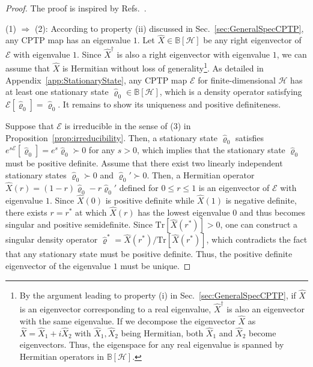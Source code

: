 \documentclass[preprint,pteplogo]{ptephy_v2}%
\numberwithin{equation}{section}
\theoremstyle{definition}
\newcommand{\mc}[1]{\mathcal{#1}}
\newcommand{\mr}[1]{\mathrm{#1}}
\newcommand{\mbb}[1]{\mathbb{#1}}
\newcommand{\Tr}{\mr{Tr}}
\begin{document}
\begin{proof}
The proof is inspired by Refs.~\cite{yoshida2024uniqueness, wolf2012quantum}.

(1) $\Rightarrow$ (2): 
According to property (ii) discussed in Sec.~\ref{sec:GeneralSpecCPTP}, any CPTP map has an eigenvalue $1$. 
Let $\hat{X} \in \mbb{B}[\mc{H}]$ be any right eigenvector of $\mc{E}$ with eigenvalue $1$.
Since $\hat{X}^\dagger$ is also a right eigenvector with eigenvalue $1$, we can assume that $\hat{X}$ is Hermitian without loss of generality\footnote{
By the argument leading to property (i) in Sec.~\ref{sec:GeneralSpecCPTP}, if $\hat{X}$ is an eigenvector corresponding to a real eigenvalue, $\hat{X}^\dagger$ is also an eigenvector with the same eigenvalue.
If we decompose the eigenvector $\hat{X}$ as $\hat{X} = \hat{X}_1 + i\hat{X}_2$ with $\hat{X}_1, \hat{X}_2$ being Hermitian, both $\hat{X}_1$ and $\hat{X}_2$ become eigenvectors. 
Thus, the eigenspace for any real eigenvalue is spanned by Hermitian operators in $\mbb{B}[\mc{H}]$.
}.
As detailed in Appendix~\ref{app:StationaryState}, any CPTP map $\mc{E}$ for finite-dimensional $\mc{H}$ has at least one stationary state $\hat{\varrho}_0 \in \mbb{B}[\mc{H}]$, which is a density operator satisfying $\mc{E}[\hat{\varrho}_0] = \hat{\varrho}_0$.
It remains to show its uniqueness and positive definiteness.

Suppose that $\mathcal{E}$ is irreducible in the sense of (3) in Proposition~\ref{prop:irreducibility}. 
Then, a stationary state $\hat{\varrho}_0$ satisfies $e^{s\mc{E}}[\hat{\varrho}_0] = e^{s} \hat{\varrho}_0 \succ 0$ for any $s>0$, which implies that the stationary state $\hat{\varrho}_0$ must be positive definite.
Assume that there exist two linearly independent stationary states $\hat{\varrho}_0 \succ 0$ and $\hat{\varrho}_0' \succ 0$.
Then, a Hermitian operator $\hat{X}(r) = (1-r) \hat{\varrho}_0 -r \hat{\varrho}_0'$ defined for $0 \leq r \leq 1$ is an eigenvector of $\mc{E}$ with eigenvalue $1$.
Since $\hat{X}(0)$ is positive definite while $\hat{X}(1)$ is negative definite, there exists $r=r^*$ at which $\hat{X}(r)$ has the lowest eigenvalue $0$ and thus becomes singular and positive semidefinite. 
Since $\Tr[\hat{X}(r^*)]>0$, one can construct a singular density operator $\hat{\varrho}^* = \hat{X}(r^*)/\Tr[\hat{X}(r^*)]$, which contradicts the fact that any stationary state must be positive definite.
Thus, the positive definite eigenvector of the eigenvalue $1$ must be unique.


\end{proof}
\end{document}
